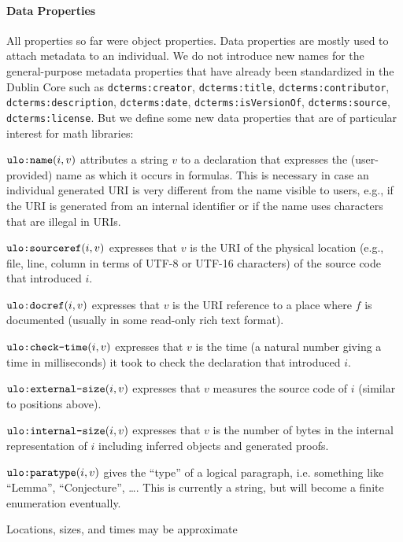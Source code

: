 \paragraph{Data Properties}
All properties so far were object properties.
Data properties are mostly used to attach metadata to an individual.
We do not introduce new names for the general-purpose metadata properties that have already been standardized in the Dublin Core such as
\verb|dcterms:creator|,
\verb|dcterms:title|,
\verb|dcterms:contributor|,
\verb|dcterms:description|,
\verb|dcterms:date|,
\verb|dcterms:isVersionOf|,
\verb|dcterms:source|,
\verb|dcterms:license|.
But we define some new data properties that are of particular interest for math libraries:
\begin{compactitem}
 \item $\ind{name}(i,v)${\isabelle\coq} attributes a string $v$ to a declaration that expresses the (user-provided) name as which it occurs in formulas.
 This is necessary in case an individual generated URI is very different from the name visible to users, e.g., if the URI is generated from an internal identifier or if the name uses characters that are illegal in URIs.
 \item $\ind{sourceref}(i,v)${\isabelle\coq} expresses that $v$ is the URI of the physical location (e.g., file, line, column in terms of UTF-8 or UTF-16 characters) of the source code that introduced $i$.
 \item $\ind{docref}(i,v)${\coq} expresses that $v$ is the URI reference to a place where $f$ is documented (usually in some read-only rich text format).
 \item $\ind{check-time}(i,v)${\isabelle} expresses that $v$ is the time (a natural number giving a time in milliseconds) it took to check the declaration that introduced $i$.
 \item $\ind{external-size}(i,v)${\isabelle} expresses that $v$ measures the source code of $i$ (similar to positions above).
 \item $\ind{internal-size}(i,v)${\coq} expresses that $v$ is the number of bytes in the internal representation of $i$ including inferred objects and generated proofs.
 \item $\ind{paratype}(i,v)${\isabelle} gives the ``type'' of a logical paragraph, i.e. something like ``Lemma'',  ``Conjecture'', \ldots. This is currently a string, but will become a finite enumeration eventually.
\end{compactitem}
Locations, sizes, and times may be approximate

